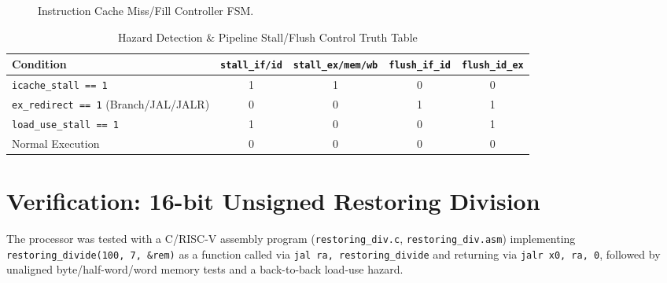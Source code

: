 \documentclass[11pt,a4paper]{article}
\begin{document}
\begin{figure}[htbp]
\centering
{}
\caption{Instruction Cache Miss/Fill Controller FSM.}
\label{fig:fsm}
\end{figure}

\begin{table}[htbp]
\centering
\caption{Hazard Detection \& Pipeline Stall/Flush Control Truth Table}
\begin{tabular}{@{}lcccc@{}}
\toprule
\textbf{Condition} & \texttt{stall\_if/id} & \texttt{stall\_ex/mem/wb} & \texttt{flush\_if\_id} & \texttt{flush\_id\_ex} \\ \midrule
\texttt{icache\_stall == 1} & 1 & 1 & 0 & 0 \\
\texttt{ex\_redirect == 1} (Branch/JAL/JALR) & 0 & 0 & 1 & 1 \\
\texttt{load\_use\_stall == 1} & 1 & 0 & 0 & 1 \\
Normal Execution & 0 & 0 & 0 & 0 \\ \bottomrule
\end{tabular}
\label{tab:hazard}
\end{table}

\section{Verification: 16-bit Unsigned Restoring Division}
The processor was tested with a C/RISC-V assembly program (\texttt{restoring\_div.c}, \texttt{restoring\_div.asm}) implementing \texttt{restoring\_divide(100, 7, \&rem)} as a function called via \texttt{jal ra, restoring\_divide} and returning via \texttt{jalr x0, ra, 0}, followed by unaligned byte/half-word/word memory tests and a back-to-back load-use hazard.
\end{document}
